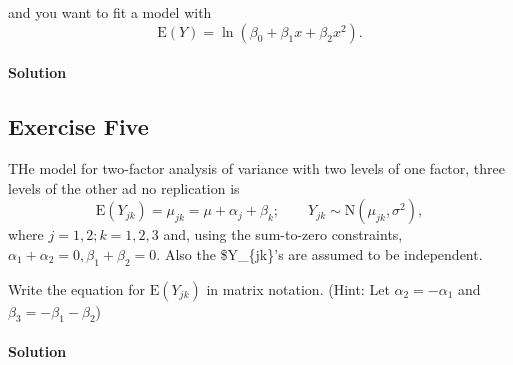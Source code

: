 \documentclass[]{article}
\let\oldparagraph\paragraph
\renewcommand{\paragraph}[1]{\oldparagraph{#1}\mbox{}}
\begin{document}
and you want to fit a model with \[
\text{E}(Y) = \ln(\beta_0 + \beta_1x + \beta_2x^2).
\]

\paragraph{Solution}\label{solution-3}

\subsection{Exercise Five}\label{exercise-five}

THe model for two-factor analysis of variance with two levels of one
factor, three levels of the other ad no replication is \[
\text{E}(Y_{jk}) = \mu_{jk} = \mu + \alpha_j + \beta_{k}; \quad \quad Y_{jk} \sim \text{N}(\mu_{jk}, \sigma^2),
\] where \(j = 1,2; k = 1,2,3\) and, using the sum-to-zero constraints,
\(\alpha_1 + \alpha_2 = 0, \beta_1 + \beta_2 = 0\). Also the
\$Y\_\{jk\}'s are assumed to be independent.

Write the equation for \(\text{E}(Y_{jk})\) in matrix notation. (Hint:
Let \(\alpha_2 = -\alpha_1\) and \(\beta_3 = -\beta_1 - \beta_2\))

\paragraph{Solution}\label{solution-4}
\end{document}
